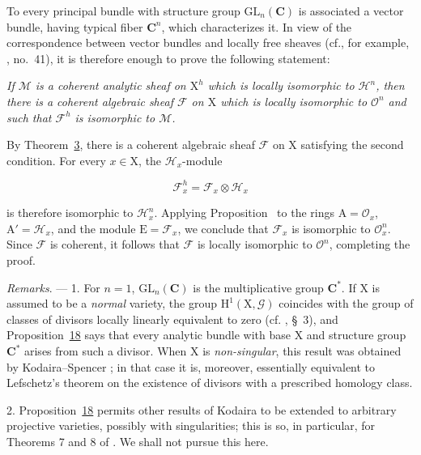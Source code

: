 To every principal bundle with structure group
$\mathrm{GL}_n(\mathbf{C})$ is associated a vector bundle,
having typical fiber $\mathbf{C}^n$, which characterizes it. In view of the
correspondence between vector bundles and locally free
sheaves (cf., for example, , no.~41), it is therefore enough to prove the
following statement:

\emph{If $\mathcal{M}$ is a coherent analytic sheaf on $\mathrm{X}^h$ which is locally
isomorphic to $\mathcal{H}^n$, then there is a coherent algebraic sheaf
$\mathcal{F}$ on $\mathrm{X}$ which is locally isomorphic to $\mathcal{O}^n$ and such
that $\mathcal{F}^h$ is isomorphic to $\mathcal{M}$.}

By Theorem~\hyperref[gaga:thm:3]{3}, there is a coherent algebraic sheaf
$\mathcal{F}$ on $\mathrm{X}$ satisfying the second condition. For every $x\in \mathrm{X}$, the
$\mathcal{H}_x$-module

\begin{equation*}
\mathcal{F}^h_x=\mathcal{F}_x\otimes\mathcal{H}_x
\end{equation*}

is therefore isomorphic to $\mathcal{H}_x^n$. Applying 
Proposition~ to the rings $\mathrm{A}=\mathcal{O}_x$, $\mathrm{A}'=\mathcal{H}_x$, and the
module $\mathrm{E}=\mathcal{F}_x$, we conclude that $\mathcal{F}_x$ is isomorphic to
$\mathcal{O}_x^n$. Since $\mathcal{F}$ is coherent, it follows that
$\mathcal{F}$ is locally isomorphic to $\mathcal{O}^n$, completing the proof.

\emph{Remarks}. --- 1. For $n=1$,
$\mathrm{GL}_n(\mathbf{C})$ is the multiplicative group $\mathbf{C}^*$. If
$\mathrm{X}$ is assumed to be a \emph{normal} variety, the group
$\mathrm{H}^1(\mathrm{X},\mathcal{G})$ coincides with the group of classes of divisors
locally linearly equivalent to zero (cf. , \S~3), and
Proposition~\hyperref[gaga:prop:18]{18} says that every analytic bundle
with base $\mathrm{X}$ and structure group $\mathbf{C}^*$ arises from such a divisor.
When $\mathrm{X}$ is \emph{non-singular}, this result was obtained by
Kodaira--Spencer ; in that case it is, moreover, essentially equivalent
to Lefschetz's theorem on the existence of divisors with a prescribed
homology class.

2. Proposition~\hyperref[gaga:prop:18]{18} permits other results of Kodaira to
be extended to arbitrary projective varieties, possibly with singularities;
this is so, in particular, for Theorems 7 and 8 of . We shall not pursue
this here.

